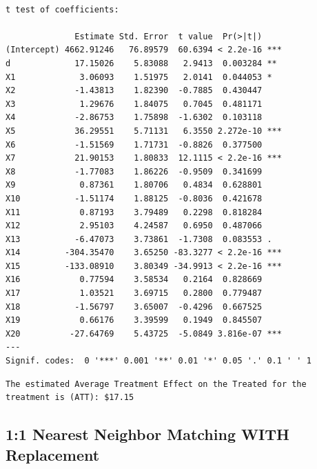 \documentclass[
  letterpaper,
  DIV=11,
  numbers=noendperiod]{scrartcl}
\begin{document}
\begin{verbatim}

t test of coefficients:

              Estimate Std. Error  t value  Pr(>|t|)    
(Intercept) 4662.91246   76.89579  60.6394 < 2.2e-16 ***
d             17.15026    5.83088   2.9413  0.003284 ** 
X1             3.06093    1.51975   2.0141  0.044053 *  
X2            -1.43813    1.82390  -0.7885  0.430447    
X3             1.29676    1.84075   0.7045  0.481171    
X4            -2.86753    1.75898  -1.6302  0.103118    
X5            36.29551    5.71131   6.3550 2.272e-10 ***
X6            -1.51569    1.71731  -0.8826  0.377500    
X7            21.90153    1.80833  12.1115 < 2.2e-16 ***
X8            -1.77083    1.86226  -0.9509  0.341699    
X9             0.87361    1.80706   0.4834  0.628801    
X10           -1.51174    1.88125  -0.8036  0.421678    
X11            0.87193    3.79489   0.2298  0.818284    
X12            2.95103    4.24587   0.6950  0.487066    
X13           -6.47073    3.73861  -1.7308  0.083553 .  
X14         -304.35470    3.65250 -83.3277 < 2.2e-16 ***
X15         -133.08910    3.80349 -34.9913 < 2.2e-16 ***
X16            0.77594    3.58534   0.2164  0.828669    
X17            1.03521    3.69715   0.2800  0.779487    
X18           -1.56797    3.65007  -0.4296  0.667525    
X19            0.66176    3.39599   0.1949  0.845507    
X20          -27.64769    5.43725  -5.0849 3.816e-07 ***
---
Signif. codes:  0 '***' 0.001 '**' 0.01 '*' 0.05 '.' 0.1 ' ' 1
\end{verbatim}

\begin{verbatim}
The estimated Average Treatment Effect on the Treated for the treatment is (ATT): $17.15
\end{verbatim}

\subsection{1:1 Nearest Neighbor Matching WITH
Replacement}\label{nearest-neighbor-matching-with-replacement}
\end{document}
